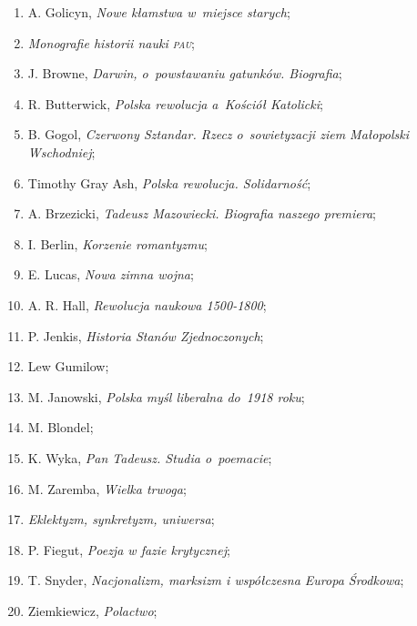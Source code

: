 \documentclass[a4paper,11pt]{article}
\begin{document}
\begin{enumerate}
\item A. Golicyn, \emph{Nowe kłamstwa w~miejsce starych};

\item \emph{Monografie historii nauki \textsc{pau}};

\item J. Browne, \emph{Darwin, o~powstawaniu gatunków. Biografia};

\item R. Butterwick, \emph{Polska rewolucja a~Kościół Katolicki};

\item B. Gogol, \emph{Czerwony Sztandar. Rzecz o~sowietyzacji ziem
    Małopolski Wschodniej};

\item Timothy Gray Ash, \emph{Polska rewolucja. Solidarność};

\item A. Brzezicki, \emph{Tadeusz Mazowiecki. Biografia naszego
    premiera};

\item I. Berlin, \emph{Korzenie romantyzmu};

\item E. Lucas, \emph{Nowa zimna wojna};

\item A. R. Hall, \emph{Rewolucja naukowa 1500-1800};

\item P. Jenkis, \emph{Historia Stanów Zjednoczonych};

\item Lew Gumilow;

\item M. Janowski, \emph{Polska myśl liberalna do~1918 roku};

\item M. Blondel;

\item K. Wyka, \emph{Pan Tadeusz. Studia o~poemacie};

\item M. Zaremba, \emph{Wielka trwoga};

\item \emph{Eklektyzm, synkretyzm, uniwersa};

\item P. Fiegut, \emph{Poezja w fazie krytycznej};

\item T. Snyder, \emph{Nacjonalizm, marksizm i współczesna Europa
    Środkowa};

\item Ziemkiewicz, \emph{Polactwo};


\end{enumerate}
\end{document}
